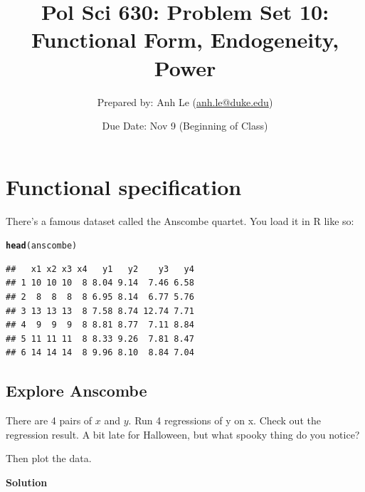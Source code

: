 \documentclass{article}\usepackage[]{graphicx}\usepackage[]{color}
\makeatletter
\newcommand{\hlstd}[1]{\textcolor[rgb]{0.345,0.345,0.345}{#1}}%
\newcommand{\hlkwd}[1]{\textcolor[rgb]{0.737,0.353,0.396}{\textbf{#1}}}%
\newenvironment{kframe}{%
 \def\at@end@of@kframe{}%
 \ifinner\ifhmode%
  \def\at@end@of@kframe{\end{minipage}}%
  \begin{minipage}{\columnwidth}%
 \fi\fi%
 \def\FrameCommand##1{\hskip\@totalleftmargin \hskip-\fboxsep
 \colorbox{shadecolor}{##1}\hskip-\fboxsep
     \hskip-\linewidth \hskip-\@totalleftmargin \hskip\columnwidth}%
 \MakeFramed {\advance\hsize-\width
   \@totalleftmargin\z@ \linewidth\hsize
   \@setminipage}}%
 {\par\unskip\endMakeFramed%
 \at@end@of@kframe}
\newenvironment{knitrout}{}{} %
\makeatother
\begin{document}
\title{Pol Sci 630:  Problem Set 10: Functional Form, Endogeneity, Power}

\author{Prepared by: Anh Le (\href{mailto:anh.le@duke.edu}{anh.le@duke.edu})}

\date{Due Date: Nov 9 (Beginning of Class)}

\maketitle

\section{Functional specification}

There's a famous dataset called the Anscombe quartet. You load it in R like so:

\begin{knitrout}
\color{fgcolor}\begin{kframe}
\begin{alltt}
\hlkwd{head}\hlstd{(anscombe)}
\end{alltt}
\begin{verbatim}
##   x1 x2 x3 x4   y1   y2    y3   y4
## 1 10 10 10  8 8.04 9.14  7.46 6.58
## 2  8  8  8  8 6.95 8.14  6.77 5.76
## 3 13 13 13  8 7.58 8.74 12.74 7.71
## 4  9  9  9  8 8.81 8.77  7.11 8.84
## 5 11 11 11  8 8.33 9.26  7.81 8.47
## 6 14 14 14  8 9.96 8.10  8.84 7.04
\end{verbatim}
\end{kframe}
\end{knitrout}

\subsection{Explore Anscombe}

There are 4 pairs of $x$ and $y$. Run 4 regressions of y on x. Check out the regression result. A bit late for Halloween, but what spooky thing do you notice?

Then plot the data.

\textbf{Solution}
\end{document}
